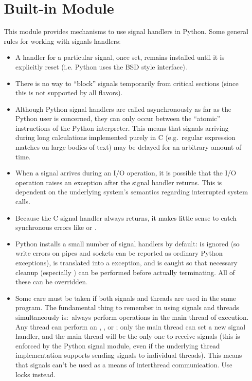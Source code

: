 \section{Built-in Module }

This module provides mechanisms to use signal handlers in Python.
Some general rules for working with signals handlers:

\begin{itemize}

\item
A handler for a particular signal, once set, remains installed until
it is explicitly reset (i.e. Python uses the BSD style interface).

\item
There is no way to ``block'' signals temporarily from critical
sections (since this is not supported by all \UNIX{} flavors).

\item
Although Python signal handlers are called asynchronously as far as
the Python user is concerned, they can only occur between the
``atomic'' instructions of the Python interpreter.  This means that
signals arriving during long calculations implemented purely in C
(e.g.\ regular expression matches on large bodies of text) may be
delayed for an arbitrary amount of time.

\item
When a signal arrives during an I/O operation, it is possible that the
I/O operation raises an exception after the signal handler returns.
This is dependent on the underlying \UNIX{} system's semantics regarding
interrupted system calls.

\item
Because the C signal handler always returns, it makes little sense to
catch synchronous errors like  or .

\item
Python installs a small number of signal handlers by default:
 is ignored (so write errors on pipes and sockets can be
reported as ordinary Python exceptions),  is translated
into a  exception, and  is
caught so that necessary cleanup (especially ) can
be performed before actually terminating.  All of these can be
overridden.

\item
Some care must be taken if both signals and threads are used in the
same program.  The fundamental thing to remember in using signals and
threads simultaneously is:\ always perform  operations
in the main thread of execution.  Any thread can perform an
, , or ; only the main
thread can set a new signal handler, and the main thread will be the
only one to receive signals (this is enforced by the Python signal
module, even if the underlying thread implementation supports sending
signals to individual threads).  This means that signals can't be used
as a means of interthread communication.  Use locks instead.

\end{itemize}


